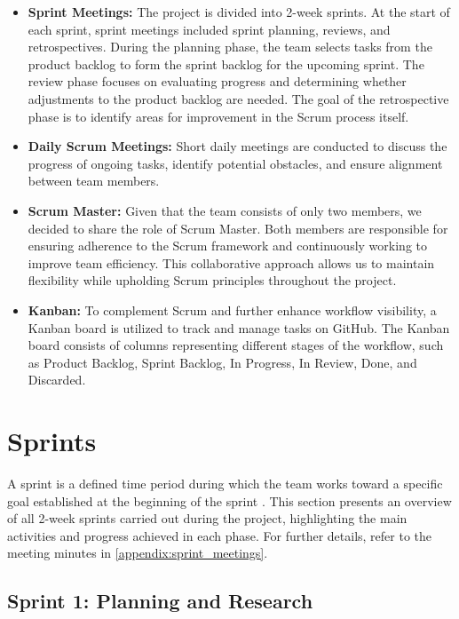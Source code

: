\begin{itemize}
    \item \textbf{Sprint Meetings:} The project is divided into 2-week sprints. At the start of each sprint, sprint meetings included sprint planning, reviews, and retrospectives. During the planning phase, the team selects tasks from the product backlog to form the sprint backlog for the upcoming sprint. The review phase focuses on evaluating progress and determining whether adjustments to the product backlog are needed. The goal of the retrospective phase is to identify areas for improvement in the Scrum process itself.
    \item \textbf{Daily Scrum Meetings:} Short daily meetings are conducted to discuss the progress of ongoing tasks, identify potential obstacles, and ensure alignment between team members. 
    \item \textbf{Scrum Master:} Given that the team consists of only two members, we decided to share the role of Scrum Master. Both members are responsible for ensuring adherence to the Scrum framework and continuously working to improve team efficiency. This collaborative approach allows us to maintain flexibility while upholding Scrum principles throughout the project.
    \item \textbf{Kanban:} To complement Scrum and further enhance workflow visibility, a Kanban board is utilized to track and manage tasks on GitHub. The Kanban board consists of columns representing different stages of the workflow, such as Product Backlog, Sprint Backlog, In Progress, In Review, Done, and Discarded.
\end{itemize}

\section{Sprints}

A sprint is a defined time period during which the team works toward a specific goal established at the beginning of the sprint \cite{scrum_guide}. This section presents an overview of all 2-week sprints carried out during the project, highlighting the main activities and progress achieved in each phase. For further details, refer to the meeting minutes in \autoref{appendix:sprint_meetings}.

\subsection*{Sprint 1: Planning and Research}

